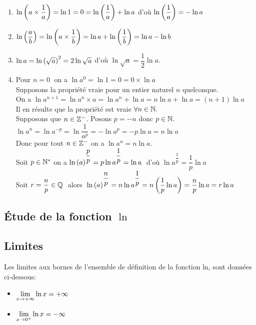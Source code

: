 \begin{enumerate}

\item $ \ln \left(a \times \dfrac{1}{a}\right)=\ln 1 =0 = \ln \left(\dfrac{1}{a}\right)+ \ln a  $ \; d'où   \;$\ln \left(\dfrac{1}{a}\right)= - \ln a$
\item $ \ln \left(\dfrac{a}{b} \right)= \ln \left( a\times \dfrac{1}{b} \right)=\ln a+ \ln \left( \dfrac{1}{b}\right)=\ln a-  \ln b $
\item $ \ln a=\ln \left(\sqrt{a}\right)^{2}=2\ln \sqrt{a} $\; d'où \;$ \ln \sqrt{a} = \dfrac{1}{2} \ln a$.
\item  Pour $ n=0 \;$ on a $ \ln a^{0}=\ln 1 =0=0\times \ln a $ \\ 
Supposons la propriété vraie pour un entier  naturel  $ n $ quelconque.  \\
On a $ \ln a^{n+1} =\ln a^{n}\times a  =\ln a^{n}+\ln a  = n\ln a+\ln a=(n+1)\ln a $ \\
Il en résulte que la propriété est vraie $ \forall n \in \mathbb{N}. $ \\
Supposons que $ n\in\mathbb{Z}^- $.\;   Posons $ p=-n $   donc $ p\in\mathbb{N}. $  \\
$ \ln a^{n}=\ln a^{-p}   =\ln \dfrac{1}{a^{p}}  =-\ln a^{p}=   -p\ln a  =n\ln a $  \\
Donc pour tout $ n\in \mathbb{Z}^- $\; on a $\ln a^{n} = n\ln a  $. \\
Soit  $ p\in \mathbb{N}^* $  on a $ \ln\left( a\right)^{\dfrac{p}{p}}  =             p\ln a^{\dfrac{1}{p}}  =\ln a\; $ d'où   $ \ln a^{\dfrac{1}{p}}=\dfrac{1}{p} \ln a $    \\  Soit $ r=\dfrac{n}{p}\in\mathbb{Q} \;$  alors  $\; \ln \left(a\right)^{\dfrac{n}{p}} =n \ln a^{\dfrac{1}{p}}  =n \left(\dfrac{1}{p} \ln a\right)  =\dfrac{n}{p} \ln a=  r\ln a$ 
\end{enumerate}



\subsection{ Étude de la fonction $\ln $}

\subsection*{Limites}
 Les limites aux bornes de l'ensemble de définition  de  la fonction ln, sont données ci-dessous:


\begin{property}
\begin{itemize}
\item $ \displaystyle\lim_{x \to +\infty}\ln x=+\infty $  
 \item   $\displaystyle \lim_{x \to 0^{+}}\ln x=-\infty $
\end{itemize}
\end{property}

